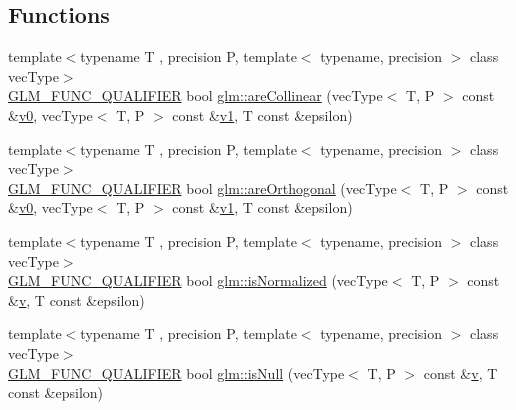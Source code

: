 \subsection*{Functions}
\begin{DoxyCompactItemize}
\item 
{\footnotesize template$<$typename T , precision P, template$<$ typename, precision $>$ class vec\+Type$>$ }\\\mbox{\hyperlink{setup_8hpp_a33fdea6f91c5f834105f7415e2a64407}{G\+L\+M\+\_\+\+F\+U\+N\+C\+\_\+\+Q\+U\+A\+L\+I\+F\+I\+ER}} bool \mbox{\hyperlink{group__gtx__vector__query_ga465b844190d1740051e45d780832ea4c}{glm\+::are\+Collinear}} (vec\+Type$<$ T, P $>$ const \&\mbox{\hyperlink{glad_8h_a7062a23d1d434121d4a88f530703d06a}{v0}}, vec\+Type$<$ T, P $>$ const \&\mbox{\hyperlink{glad_8h_a0779c3b73f9aa3a0ac5b0139b5d291d9}{v1}}, T const \&epsilon)
\item 
{\footnotesize template$<$typename T , precision P, template$<$ typename, precision $>$ class vec\+Type$>$ }\\\mbox{\hyperlink{setup_8hpp_a33fdea6f91c5f834105f7415e2a64407}{G\+L\+M\+\_\+\+F\+U\+N\+C\+\_\+\+Q\+U\+A\+L\+I\+F\+I\+ER}} bool \mbox{\hyperlink{group__gtx__vector__query_gaee10acefed397c11e01f2862e837754c}{glm\+::are\+Orthogonal}} (vec\+Type$<$ T, P $>$ const \&\mbox{\hyperlink{glad_8h_a7062a23d1d434121d4a88f530703d06a}{v0}}, vec\+Type$<$ T, P $>$ const \&\mbox{\hyperlink{glad_8h_a0779c3b73f9aa3a0ac5b0139b5d291d9}{v1}}, T const \&epsilon)
\item 
{\footnotesize template$<$typename T , precision P, template$<$ typename, precision $>$ class vec\+Type$>$ }\\\mbox{\hyperlink{setup_8hpp_a33fdea6f91c5f834105f7415e2a64407}{G\+L\+M\+\_\+\+F\+U\+N\+C\+\_\+\+Q\+U\+A\+L\+I\+F\+I\+ER}} bool \mbox{\hyperlink{group__gtx__vector__query_ga6fa5fa2af67d14c205d24c49aad03270}{glm\+::is\+Normalized}} (vec\+Type$<$ T, P $>$ const \&\mbox{\hyperlink{glad_8h_a14cfbe2fc2234f5504618905b69d1e06}{v}}, T const \&epsilon)
\item 
{\footnotesize template$<$typename T , precision P, template$<$ typename, precision $>$ class vec\+Type$>$ }\\\mbox{\hyperlink{setup_8hpp_a33fdea6f91c5f834105f7415e2a64407}{G\+L\+M\+\_\+\+F\+U\+N\+C\+\_\+\+Q\+U\+A\+L\+I\+F\+I\+ER}} bool \mbox{\hyperlink{group__gtx__vector__query_ga81a64edc1a2b470b82896592e89c523b}{glm\+::is\+Null}} (vec\+Type$<$ T, P $>$ const \&\mbox{\hyperlink{glad_8h_a14cfbe2fc2234f5504618905b69d1e06}{v}}, T const \&epsilon)

\end{DoxyCompactItemize}
